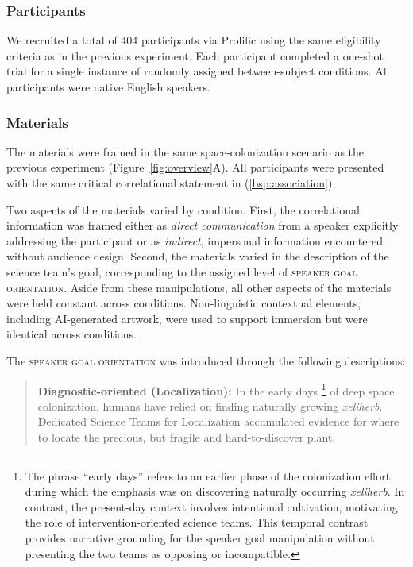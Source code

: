 \documentclass[10pt,letterpaper]{article}
\begin{document}
\subsubsection{Participants}

We recruited a total of 404 participants via Prolific using the same eligibility criteria as in the previous experiment. Each participant completed a one-shot trial for a single instance of randomly assigned between-subject conditions. All participants were native English speakers.

\subsubsection{Materials}

The materials %
were framed in the same space-colonization scenario as the previous experiment (Figure~\ref{fig:overview}A).
All participants were presented with the same critical correlational statement in (\ref{bsp:association}).

Two aspects of the materials varied by condition. First, the correlational information was framed either as \emph{direct communication} from a speaker explicitly addressing the participant or as \emph{indirect}, impersonal information encountered without audience design. Second, the materials varied in the description of the science team’s goal, corresponding to the assigned level of \textsc{speaker goal orientation}. Aside from these manipulations, all other aspects of the materials were held constant across conditions. Non-linguistic contextual elements, including AI-generated artwork, were used to support immersion but were identical across conditions.

The \textsc{speaker goal orientation} was introduced through the following descriptions:

\begin{quote}
    \small
    \textbf{Diagnostic-oriented (Localization):}  
    In the early days \footnote{The phrase “early days” refers to an earlier phase of the colonization effort, during which the emphasis was on discovering naturally occurring \textit{xeliherb}. In contrast, the present-day context involves intentional cultivation, motivating the role of intervention-oriented science teams. This temporal contrast provides narrative grounding for the speaker goal manipulation without presenting the two teams as opposing or incompatible.} of deep space colonization, humans have relied on finding naturally growing \textit{xeliherb}. Dedicated Science Teams for Localization accumulated evidence for where to locate the precious, but fragile and hard-to-discover plant.
\end{quote}
\end{document}
